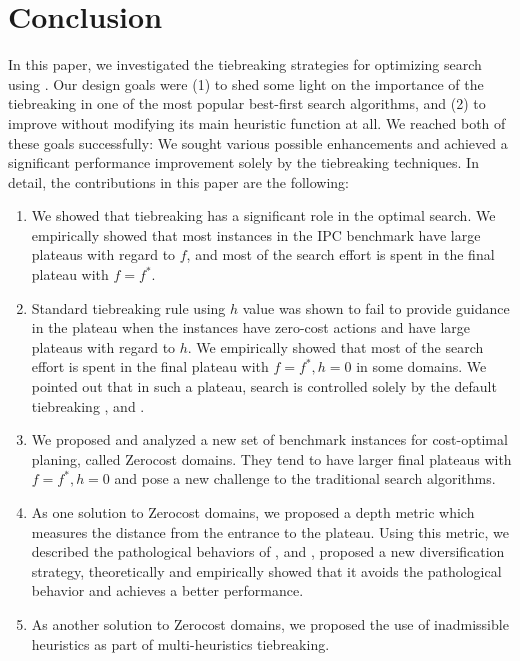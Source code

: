 
\section{Conclusion}

In this paper, we investigated the tiebreaking strategies for optimizing search using \astar.  Our design goals
were (1) to shed some light on the importance of the tiebreaking in one of the most popular best-first search
algorithms, and (2) to improve \astar without modifying its main heuristic function at all. We reached both of
these goals successfully: We sought various possible enhancements and achieved a significant performance
improvement solely by the tiebreaking techniques. In detail, the contributions in this paper are the following:

\begin{enumerate}
 \item We showed that tiebreaking has a significant role in the optimal
       search. We empirically showed that most instances in the IPC
       benchmark have large plateaus with regard to $f$, and most of the
       search effort is spent in the final plateau with $f=f^*$.
 \item Standard tiebreaking rule using $h$ value was shown to fail to
       provide guidance in the plateau when the instances have zero-cost
       actions and have large plateaus with regard to $h$.
       We empirically showed that most of the search effort is spent in
       the final plateau with $f=f^*, h=0$ in some domains. We pointed out that in such
       a plateau, search is controlled solely by the
       default tiebreaking \fifo, \lifo and \ro.
 \item We proposed and analyzed a new set of benchmark instances for cost-optimal planing, called Zerocost domains.
       They tend to have larger final plateaus with $f=f^*, h=0$ and pose a new challenge to the traditional search
       algorithms.
 \item As one solution to Zerocost domains, we proposed a depth metric
       which measures the distance from the entrance to the
       plateau. Using this metric, we described the pathological
       behaviors of \fifo, \lifo and \ro, proposed a new diversification
       strategy, theoretically and empirically showed that it avoids the
       pathological behavior and achieves a better performance.
 \item As another solution to Zerocost domains, we proposed the use of
       inadmissible heuristics as part of multi-heuristics tiebreaking.

\end{enumerate}

